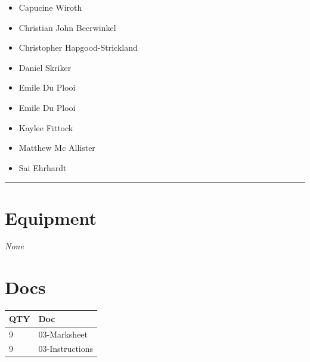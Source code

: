 \documentclass[10pt]{article}
\begin{document}
	\begin{multicols}{2}

		\begin{itemize}
									\item Capucine Wiroth
									\item Christian John Beerwinkel
									\item Christopher Hapgood-Strickland
									\item Daniel Skriker
									\item Emile Du Plooi
						\end{itemize}

		\vfill\null
		\columnbreak

		\begin{itemize}
									\item Emile Du Plooi
									\item Kaylee Fittock
									\item Matthew Mc Allister
									\item Sai Ehrhardt
						\end{itemize}

		\vfill\null

		\end{multicols}



			\vspace{0.5cm}
	\hrule
	\vspace{0.5cm}

	\begin{multicols}{2}

		\section*{\faWrench \: Equipment}

				\textit{None}
		
		\vfill\null
		\columnbreak

			\section*{\faFile \: Docs}
		 	\begin{center}
			\begin{tabular}{p{2cm}p{4cm}}

			\textbf{QTY} & \textbf{Doc} \\\toprule
										9&03-Marksheet\\\midrule
										9&03-Instructions\\\midrule
							\end{tabular}
			\end{center}
	

		\vfill\null

		\end{multicols}
\end{document}
